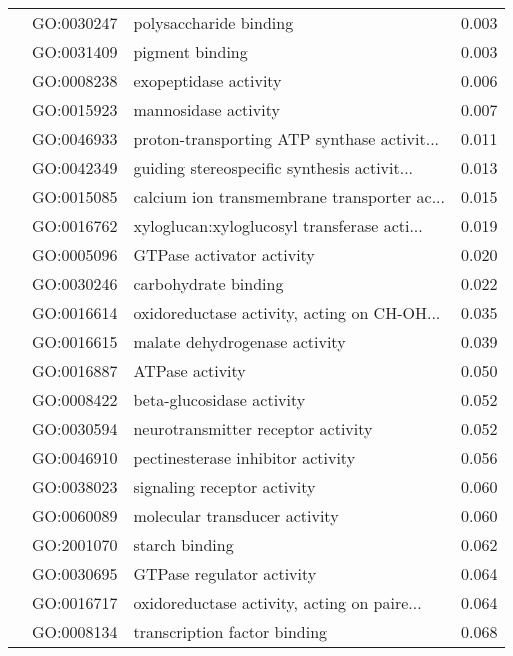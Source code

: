 \begin{longtable}{lllr}
   & GO:0030247 &                       polysaccharide binding &         0.003 \\
   & GO:0031409 &                              pigment binding &         0.003 \\
   & GO:0008238 &                        exopeptidase activity &         0.006 \\
   & GO:0015923 &                         mannosidase activity &         0.007 \\
   & GO:0046933 &  proton-transporting ATP synthase activit... &         0.011 \\
   & GO:0042349 &  guiding stereospecific synthesis activit... &         0.013 \\
   & GO:0015085 &  calcium ion transmembrane transporter ac... &         0.015 \\
   & GO:0016762 &  xyloglucan:xyloglucosyl transferase acti... &         0.019 \\
   & GO:0005096 &                    GTPase activator activity &         0.020 \\
   & GO:0030246 &                         carbohydrate binding &         0.022 \\
   & GO:0016614 &  oxidoreductase activity, acting on CH-OH... &         0.035 \\
   & GO:0016615 &                malate dehydrogenase activity &         0.039 \\
   & GO:0016887 &                              ATPase activity &         0.050 \\
   & GO:0008422 &                    beta-glucosidase activity &         0.052 \\
   & GO:0030594 &           neurotransmitter receptor activity &         0.052 \\
   & GO:0046910 &            pectinesterase inhibitor activity &         0.056 \\
   & GO:0038023 &                  signaling receptor activity &         0.060 \\
   & GO:0060089 &                molecular transducer activity &         0.060 \\
   & GO:2001070 &                               starch binding &         0.062 \\
   & GO:0030695 &                    GTPase regulator activity &         0.064 \\
   & GO:0016717 &  oxidoreductase activity, acting on paire... &         0.064 \\
   & GO:0008134 &                 transcription factor binding &         0.068 \\

\end{longtable}
